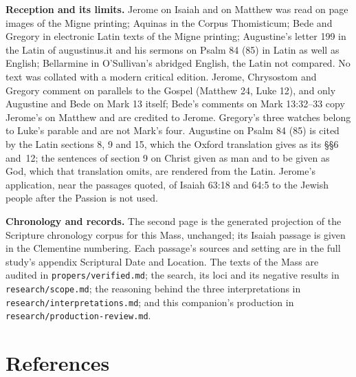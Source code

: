 {\textbf{Reception and its limits.} Jerome on Isaiah and on Matthew was read on
page images of the Migne printing; Aquinas in the Corpus Thomisticum; Bede and
Gregory in electronic Latin texts of the Migne printing; Augustine's letter 199
in the Latin of augustinus.it and his sermons on Psalm 84 (85) in Latin as well
as English; Bellarmine in O'Sullivan's abridged English, the Latin not
compared. No text was collated with a modern critical edition. Jerome,
Chrysostom and Gregory comment on parallels to the Gospel (Matthew 24, Luke
12), and only Augustine and Bede on Mark 13 itself; Bede's comments on Mark
13:32--33 copy Jerome's on Matthew and are credited to Jerome. Gregory's three
watches belong to Luke's parable and are not Mark's four. Augustine on Psalm
84 (85) is cited by the Latin sections 8, 9 and 15, which the Oxford
translation gives as its §§6 and~12; the sentences of section 9 on Christ given
as man and to be given as God, which that translation omits, are rendered from
the Latin. Jerome's application, near the passages quoted, of Isaiah 63:18 and
64:5 to the Jewish people after the Passion is not used.

\textbf{Chronology and records.} The second page is the generated projection of
the Scripture chronology corpus for this Mass, unchanged; its Isaiah passage is
given in the Clementine numbering. Each passage's sources and setting are in
the full study's appendix Scriptural Date and Location. The texts of the Mass
are audited in \texttt{propers/verified.md}; the search, its loci and its
negative results in \texttt{research/scope.md}; the reasoning behind the three
interpretations in \texttt{research/interpretations.md}; and this companion's
production in \texttt{research/production-review.md}.
\par}

\section*{References}

